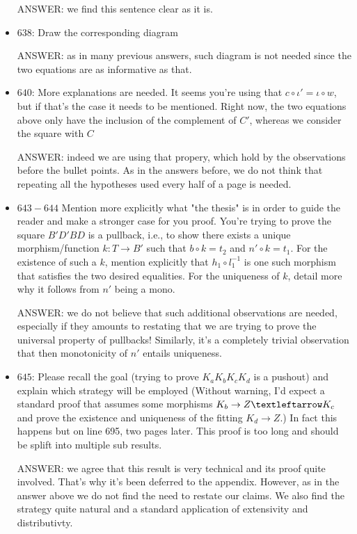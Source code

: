\documentclass[english,11pt,a4paper]{article}
\begin{document}
\begin{itemize}
ANSWER: we find this sentence clear as it is.

\item $638$: Draw the corresponding diagram

ANSWER: as in many previous answers, such diagram is not needed since the two equations are as informative as that. 

\item $640$: More explanations are needed. It seems you're using that $c \circ \iota' = \iota \circ w$, but if that's the case it needs to be mentioned. Right now, the two equations above only have the inclusion of the complement of $C'$, whereas we consider the square with $C$

ANSWER: indeed we are using that propery, which hold by the observations before the bullet points. As in the answers before, we do not think that repeating all the hypotheses used every half of a page is needed. 

\item $643-644$ Mention more explicitly what "the thesis" is in order to guide the reader and make a stronger case for you proof. You're trying to prove the square $B'D'BD$ is a pullback, i.e., to show there exists a unique morphism/function $k \colon  T \to B'$ such that $b\circ k=t_2$ and $n'\circ k = t_1$. For the existence of such a $k$, mention explicitly that $h_1 \circ l_1^{-1}$ is one such morphism that satisfies the two desired equalities. For the uniqueness of $k$, detail more why it follows from $n'$ being a mono.

ANSWER:  we do not believe that such additional observations are needed, especially if they amounts to restating that we are trying to prove the universal property of pullbacks! Similarly, it's a completely trivial observation that then monotonicity of $n'$ entails uniqueness.

\item $645$: Please recall the goal (trying to prove $K_aK_bK_cK_d$ is a pushout) and explain which strategy will be employed (Without warning, I'd expect a standard proof that assumes some morphisms $K_b \to Z \textleftarrow K_c$ and prove the existence and uniqueness of the fitting $K_d \to Z$.) In fact this happens but on line 695, two pages later. This proof is too long and should be splift into multiple sub results.

ANSWER: we agree that this result is very technical and its proof quite involved. That's why it's been deferred to the appendix. However, as in the answer above we do not find the need to restate our claims. We also find the strategy quite natural and a standard application of extensivity and distributivty.



\end{itemize}
\end{document}
